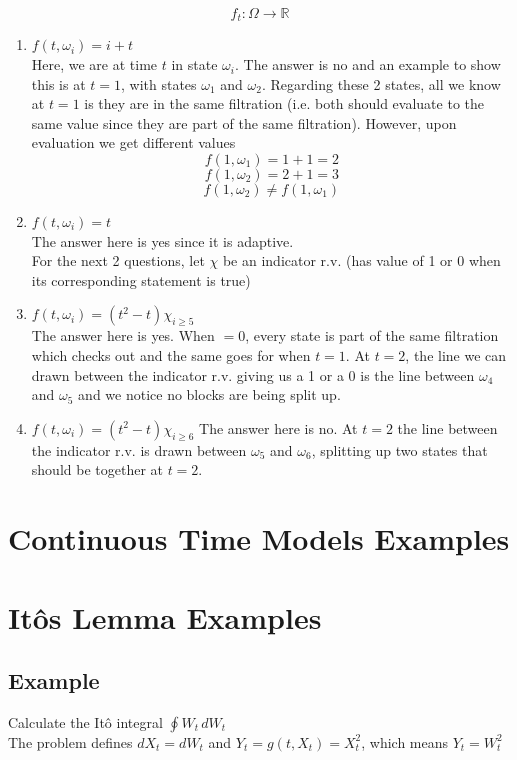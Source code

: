 \documentclass[11pt]{article}
\begin{document}
\[f_t : \Omega \rightarrow \mathbb{R}\]
\begin{enumerate}
    \item $f(t, \omega_i) = i + t$ \\ 
    Here, we are at time $t$ in state $\omega_i$. The answer is no and an example to show this 
    is at $t=1$, with states $\omega_1$ and $\omega_2$. Regarding these 2 states, all we know 
    at $t=1$ is they are in the same filtration (i.e. both should evaluate to the same value 
    since they are part of the same filtration). However, upon evaluation we get different 
    values 
    \[f(1, \omega_1) = 1 + 1 = 2 \]
    \[f(1, \omega_2) = 2 + 1 = 3 \]
    \[f(1, \omega_2) \ne f(1, \omega_1) \]


    \item $f(t, \omega_i) = t$ \\ 
    The answer here is yes since it is adaptive. \\
    
    For the next 2 questions, let $\chi$ be an indicator r.v. (has value of 1 or 0 when its 
    corresponding statement is true)
    \item $f(t, \omega_i) = {(t^2 - t)}{\chi_{i \ge 5}}$ \\ 
    The answer here is yes. When $=0$, every state is part of the same filtration which checks 
    out and the same goes for when $t=1$. At $t=2$, the line we can drawn between the 
    indicator r.v. giving us a 1 or a 0 is the line between $\omega_4$ and $\omega_5$ and we 
    notice no blocks are being split up.

    \item $f(t, \omega_i) = {(t^2 - t)}{\chi_{i \ge 6}}$
    The answer here is no. At $t=2$ the line between the indicator r.v. is drawn between 
    $\omega_5$ and $\omega_6$, splitting up two states that should be together at $t=2$.
\end{enumerate}

\section{Continuous Time Models Examples}


\section{It\^{o}s Lemma Examples}
\subsection{Example}
Calculate the It\^{o} integral $\oint W_t \, dW_t$ \\ 
The problem defines $dX_t = dW_t$  and $Y_t =  g(t, X_t) = X_t^2$, which means $Y_t = W_t^2$
\end{document}
